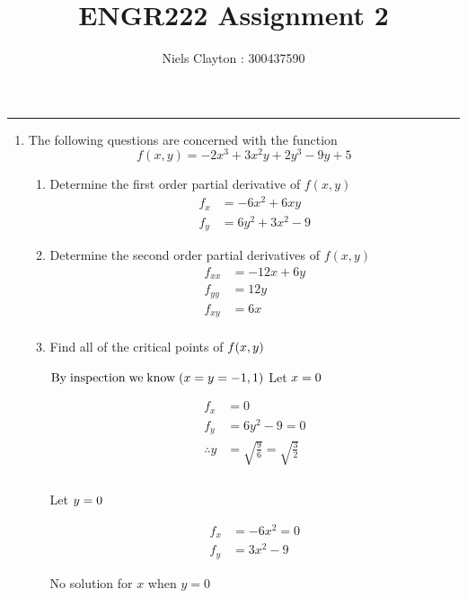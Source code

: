 \documentclass[a4paper,11pt]{article}
\begin{document}
\title{\LARGE{\textbf{ENGR222 Assignment 2}}}
\author{Niels Clayton : 300437590}
\date{}
\maketitle
\hrule

\begin{enumerate}
    \item The following questions are concerned with the function
    $$ f(x,y) = -2x^3 + 3x^2y + 2y^3 - 9y +5$$

    \begin{enumerate}
        \item Determine the first order partial derivative of $f(x, y)$
        \begin{align*}
            f_x &= -6x^2 + 6xy \\
            f_y &=  6y^2 + 3x^2 - 9
        \end{align*}
    
        \item Determine the second order partial derivatives of $f(x, y)$
        \begin{align*}
            f_{xx} &= -12x + 6y\\
            f_{yy} &= 12y \\
            f_{xy} &= 6x\\
        \end{align*}
    
        \item Find all of the critical points of $f(x, y)\\$

            $\mathrm{By \; inspection \; we \; know \;}  (x=y= -1,1)\\\\$
            Let $x = 0\\$

            \begin{align*}
                f_{x} &= 0 \\
                f_{y} &= 6y^2 - 9 = 0\\
                \therefore y &= \sqrt{\frac{9}{6}} = \sqrt{\frac{3}{2}}\\\\
            \end{align*}

            Let $y = 0\\$

            \begin{align*}
                f_{x} &= -6x^2 = 0 \\
                f_{y} &= 3x^2 -9 
            \end{align*}
            \begin{center}
                No solution for $x$ when $y=0$ \newline
            \end{center}


\end{enumerate}
\end{enumerate}
\end{document}
